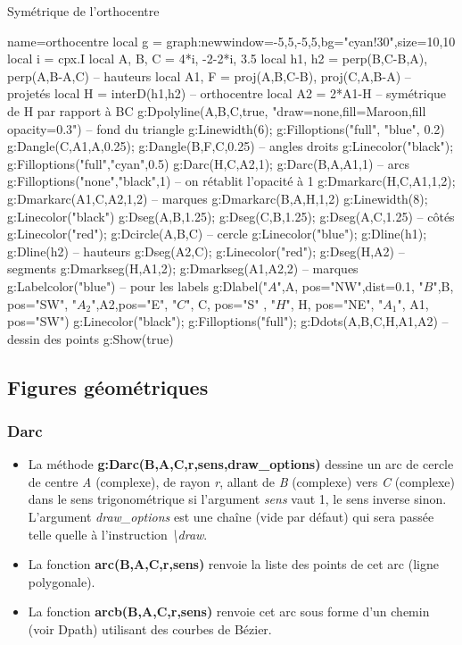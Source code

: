 \begin{demo}{Symétrique de l'orthocentre}
\begin{luadraw}{name=orthocentre}
local g = graph:new{window={-5,5,-5,5},bg="cyan!30",size={10,10}}
local i = cpx.I
local A, B, C = 4*i, -2-2*i, 3.5
local h1, h2 = perp({B,C-B},A), perp({A,B-A},C) -- hauteurs
local A1, F = proj(A,{B,C-B}), proj(C,{A,B-A}) -- projetés
local H = interD(h1,h2) -- orthocentre
local A2 = 2*A1-H -- symétrique de H par rapport à BC
g:Dpolyline({A,B,C},true, "draw=none,fill=Maroon,fill opacity=0.3") -- fond du triangle
g:Linewidth(6); g:Filloptions("full", "blue", 0.2)
g:Dangle(C,A1,A,0.25); g:Dangle(B,F,C,0.25) -- angles droits
g:Linecolor("black"); g:Filloptions("full","cyan",0.5)
g:Darc(H,C,A2,1); g:Darc(B,A,A1,1) -- arcs
g:Filloptions("none","black",1) -- on rétablit l'opacité à 1
g:Dmarkarc(H,C,A1,1,2); g:Dmarkarc(A1,C,A2,1,2) -- marques
g:Dmarkarc(B,A,H,1,2)
g:Linewidth(8); g:Linecolor("black")
g:Dseg({A,B},1.25); g:Dseg({C,B},1.25); g:Dseg({A,C},1.25) -- côtés
g:Linecolor("red"); g:Dcircle(A,B,C) -- cercle
g:Linecolor("blue"); g:Dline(h1); g:Dline(h2) -- hauteurs
g:Dseg({A2,C}); g:Linecolor("red"); g:Dseg({H,A2}) -- segments
g:Dmarkseg(H,A1,2); g:Dmarkseg(A1,A2,2) -- marques
g:Labelcolor("blue") -- pour les labels
g:Dlabel("$A$",A, {pos="NW",dist=0.1}, "$B$",B, {pos="SW"}, "$A_2$",A2,{pos="E"}, "$C$", C, {pos="S" }, "$H$", H, {pos="NE"}, "$A_1$", A1, {pos="SW"})
g:Linecolor("black"); g:Filloptions("full"); g:Ddots({A,B,C,H,A1,A2}) -- dessin des points
g:Show(true)
\end{luadraw}
\end{demo}

\subsection{Figures géométriques}

\subsubsection{Darc}
\begin{itemize}
    \item La méthode \textbf{g:Darc(B,A,C,r,sens,draw\_options)} dessine un arc de cercle de centre \emph{A} (complexe), de rayon \emph{r}, allant de \emph{B} (complexe) vers \emph{C} (complexe) dans le sens trigonométrique si l'argument \emph{sens} vaut 1, le sens inverse sinon. L'argument \emph{draw\_options} est une chaîne (vide par défaut) qui sera passée telle quelle à l'instruction \emph{\textbackslash draw}.
    \item La fonction \textbf{arc(B,A,C,r,sens)} renvoie la liste des points de cet arc (ligne polygonale). 
    \item La fonction \textbf{arcb(B,A,C,r,sens)} renvoie cet arc sous forme d'un chemin (voir Dpath) utilisant des courbes de Bézier.
\end{itemize}

